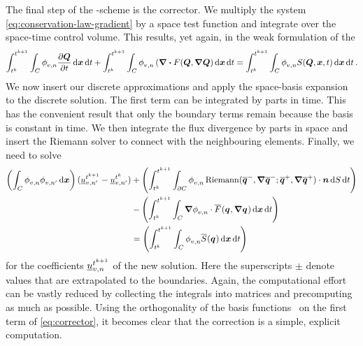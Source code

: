 The final step of the \aderdg{}-scheme is the corrector.
We multiply the system \cref{eq:conservation-law-gradient} by a space test function and integrate over the space-time control volume.
This results, yet again, in the weak formulation of the \pde{}
\begin{equation}
  \label{eq:weak-pde}
\intdt{\intdcell{
\stestfunction[][v,n] \pdv{\Q}{t}
}}
+
\intdt{\intdcell{
    \stestfunction[][v,n] \left( \div{F(\Q, \gradQ } \right)
}}
=
\intdt{\intdcell{
    \stestfunction[][v,n] S(\Q, \bm{x}, t)
}}.
\end{equation}
We now insert our discrete approximations and apply the space-basis expansion~ to the discrete solution.
The first term can be integrated by parts in time.
This has the convenient result that only the boundary terms remain because the basis is constant in time.
We then integrate the flux divergence by parts in space and insert the Riemann solver to connect with the neighbouring elements.
Finally, we need to solve
\newcommand{\massMatrixDef}{\intdcell{
  \stestfunction[][v,n] \sbasis[][v,n']
}}%
\begin{align}
\begin{split}
\label{eq:corrector}
\left(
\massMatrixDef
\right)
(\ssolCoeff[\nextTime][v,n'] - \ssolCoeff[\curTime][v,n'])
&+
\left(\intdt{\intdcellb{
      \stestfunction[][v,n] \Riemann(\stpredictor[-], \gradient{\stpredictor[-]}; \stpredictor[+], \gradient{\stpredictor[+]}) \cdot \normal
}}\right)
\\&-
\left(\intdt{\intdcell{
    \gradient{\stestfunction[][v,n]} \cdot  \stflux(\spredictor, \gradient{\spredictor})
}}\right)
\\&=
\left(\intdt{\intdcell{
      \stestfunction[][v,n] \stsource(\spredictor)
}}\right)
\end{split}
\end{align}
for the coefficients $\ssolCoeff[\nextTime][v,n]$ of the new solution.
Here the superscripts $\pm$ denote values that are extrapolated to the boundaries.
Again, the computational effort can be vastly reduced by collecting the integrals into matrices and precomputing as much as possible.
Using the orthogonality of the basis functions~ on the first term of \cref{eq:corrector}, it becomes clear that the correction is a simple, explicit computation.
